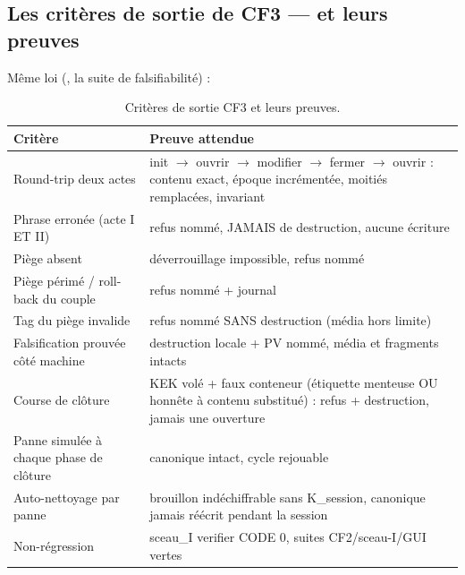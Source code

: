 \subsection{Les critères de sortie de CF3 — et leurs preuves}

Même loi (, la suite de falsifiabilité) :

\begin{table}[htbp]
\centering\small
\caption{Critères de sortie CF3 et leurs preuves.}
\label{tab:sortiecf3}
\begin{tabularx}{\textwidth}{@{}Y Y@{}}
\toprule
\textbf{Critère} & \textbf{Preuve attendue} \\
\midrule
Round-trip deux actes & init $\to$ ouvrir $\to$ modifier $\to$ fermer $\to$ ouvrir :
contenu exact, époque incrémentée, moitiés remplacées,  invariant \\
Phrase erronée (acte I ET II) & refus nommé, JAMAIS de destruction, aucune écriture \\
Piège absent & déverrouillage impossible, refus nommé \\
Piège périmé / roll-back du couple & refus nommé + journal \\
Tag du piège invalide & refus nommé SANS destruction (média hors limite) \\
Falsification prouvée côté machine & destruction locale + PV nommé, média et fragments
intacts \\
Course de clôture & KEK volé + faux conteneur (étiquette menteuse OU honnête à
contenu substitué) : refus + destruction, jamais une ouverture \\
Panne simulée à chaque phase de clôture & canonique intact, cycle rejouable \\
Auto-nettoyage par panne & brouillon indéchiffrable sans K\_session, canonique jamais
réécrit pendant la session \\
Non-régression & sceau\_I verifier CODE 0, suites CF2/sceau-I/GUI vertes \\
\bottomrule
\end{tabularx}
\end{table}
